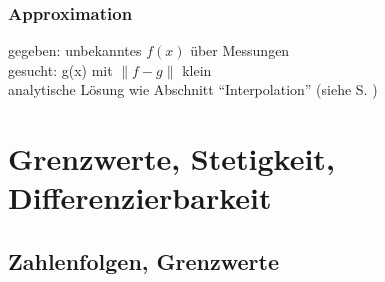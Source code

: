 \subsubsection*{Approximation}
gegeben: unbekanntes $f(x)$ über Messungen \\
gesucht: g(x) mit $\left\| f - g \right\|$ klein \\
analytische Lösung wie Abschnitt "`Interpolation"' (siehe S. \pageref{interpolation})

\section{Grenzwerte, Stetigkeit, Differenzierbarkeit}

\subsection{Zahlenfolgen, Grenzwerte}


